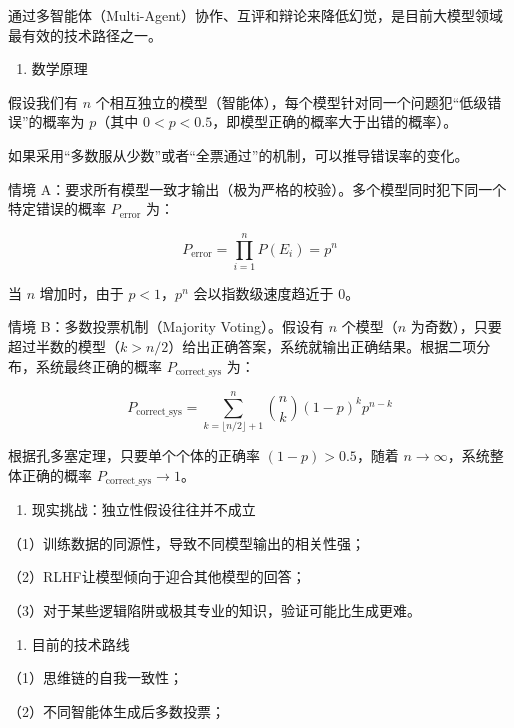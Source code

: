 通过多智能体（Multi-Agent）协作、互评和辩论来降低幻觉，是目前大模型领域最有效的技术路径之一。

\begin{enumerate}
\def\labelenumi{\arabic{enumi}.}
\tightlist
\item
  数学原理
\end{enumerate}

假设我们有 \(n\) 个相互独立的模型（智能体），每个模型针对同一个问题犯``低级错误''的概率为 \(p\)（其中 \(0<p<0.5\)，即模型正确的概率大于出错的概率）。

如果采用``多数服从少数''或者``全票通过''的机制，可以推导错误率的变化。

情境 A：要求所有模型一致才输出（极为严格的校验）。多个模型同时犯下同一个特定错误的概率 \(P_{\mathrm{error}}\) 为：

\[
P_{\mathrm{error}}=\prod_{i=1}^{n}P(E_i)=p^n
\]

当 \(n\) 增加时，由于 \(p<1\)，\(p^n\) 会以指数级速度趋近于 0。

情境 B：多数投票机制（Majority Voting）。假设有 \(n\) 个模型（\(n\) 为奇数），只要超过半数的模型（\(k>n/2\)）给出正确答案，系统就输出正确结果。根据二项分布，系统最终正确的概率 \(P_{\mathrm{correct\_sys}}\) 为：

\[
P_{\mathrm{correct\_sys}}
=\sum_{k=\lfloor n/2 \rfloor+1}^{n}
\binom{n}{k}(1-p)^k p^{n-k}
\]

根据孔多塞定理，只要单个个体的正确率 \((1-p)>0.5\)，随着 \(n\to\infty\)，系统整体正确的概率 \(P_{\mathrm{correct\_sys}}\to 1\)。

\begin{enumerate}
\def\labelenumi{\arabic{enumi}.}
\setcounter{enumi}{1}
\tightlist
\item
  现实挑战：独立性假设往往并不成立
\end{enumerate}

（1）训练数据的同源性，导致不同模型输出的相关性强；

（2）RLHF让模型倾向于迎合其他模型的回答；

（3）对于某些逻辑陷阱或极其专业的知识，验证可能比生成更难。

\begin{enumerate}
\def\labelenumi{\arabic{enumi}.}
\setcounter{enumi}{2}
\tightlist
\item
  目前的技术路线
\end{enumerate}

（1）思维链的自我一致性；

（2）不同智能体生成后多数投票；

